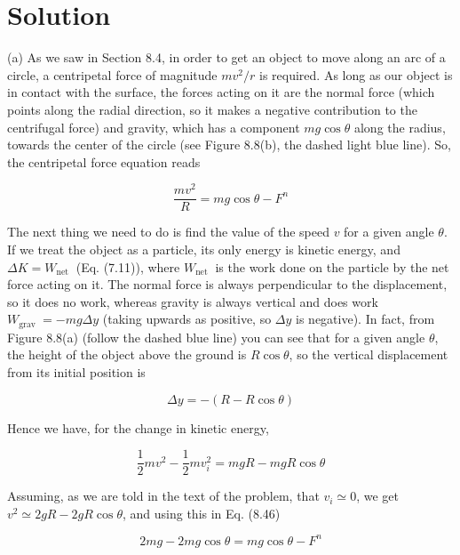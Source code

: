 \documentclass[10pt]{article}
\begin{document}
\section*{Solution}
(a) As we saw in Section 8.4, in order to get an object to move along an arc of a circle, a centripetal force of magnitude $m v^{2} / r$ is required. As long as our object is in contact with the surface, the forces acting on it are the normal force (which points along the radial direction, so it makes a negative contribution to the centrifugal force) and gravity, which has a component $m g \cos \theta$ along the radius, towards the center of the circle (see Figure 8.8(b), the dashed light blue line). So, the centripetal force equation reads


\begin{equation*}
\frac{m v^{2}}{R}=m g \cos \theta-F^{n} \tag{8.46}
\end{equation*}


The next thing we need to do is find the value of the speed $v$ for a given angle $\theta$. If we treat the object as a particle, its only energy is kinetic energy, and $\Delta K=W_{\text {net }}$ (Eq. (7.11)), where $W_{\text {net }}$ is the work done on the particle by the net force acting on it. The normal force is always perpendicular to the displacement, so it does no work, whereas gravity is always vertical and does work $W_{\text {grav }}=-m g \Delta y$ (taking upwards as positive, so $\Delta y$ is negative). In fact, from Figure 8.8(a) (follow the dashed blue line) you can see that for a given angle $\theta$, the height of the object above the ground is $R \cos \theta$, so the vertical displacement from its initial position is


\begin{equation*}
\Delta y=-(R-R \cos \theta) \tag{8.47}
\end{equation*}


Hence we have, for the change in kinetic energy,


\begin{equation*}
\frac{1}{2} m v^{2}-\frac{1}{2} m v_{i}^{2}=m g R-m g R \cos \theta \tag{8.48}
\end{equation*}


Assuming, as we are told in the text of the problem, that $v_{i} \simeq 0$, we get $v^{2} \simeq 2 g R-2 g R \cos \theta$, and using this in Eq. (8.46)


\begin{equation*}
2 m g-2 m g \cos \theta=m g \cos \theta-F^{n} \tag{8.49}
\end{equation*}
\end{document}
